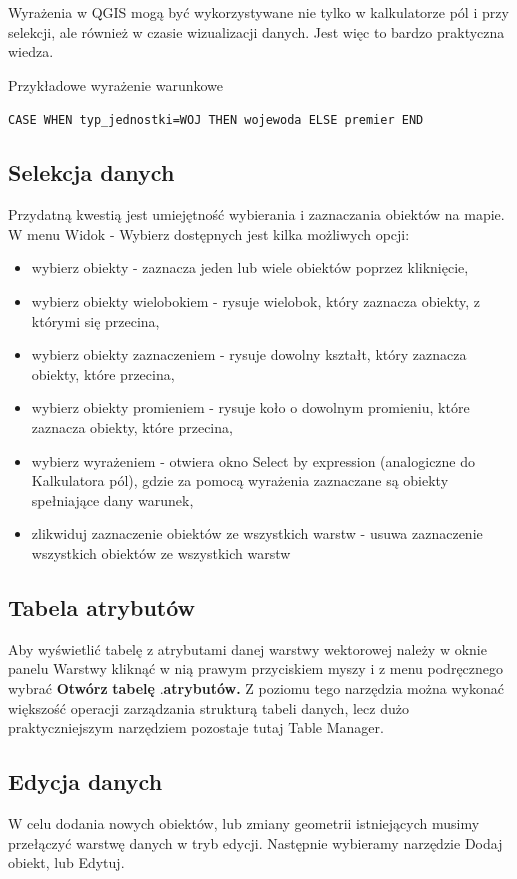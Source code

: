 \documentclass[12pt,a4paper]{book}
\begin{document}
Wyrażenia w QGIS mogą być wykorzystywane nie tylko w kalkulatorze pól i przy selekcji, ale również w czasie wizualizacji danych. Jest więc to bardzo praktyczna wiedza.

Przykładowe wyrażenie warunkowe

\texttt{CASE WHEN typ\_jednostki=WOJ THEN wojewoda ELSE premier END}

\subsection{Selekcja danych}
Przydatną kwestią jest umiejętność wybierania i zaznaczania obiektów na mapie. W menu Widok - Wybierz dostępnych jest kilka możliwych opcji:

\begin{itemize}
\item wybierz obiekty - zaznacza jeden lub wiele obiektów poprzez kliknięcie,
\item  wybierz obiekty wielobokiem - rysuje wielobok, który zaznacza obiekty, z którymi się przecina,
\item  wybierz obiekty zaznaczeniem - rysuje dowolny kształt, który zaznacza obiekty, które przecina,
\item wybierz obiekty promieniem - rysuje koło o dowolnym promieniu, które zaznacza obiekty, które przecina,
\item wybierz wyrażeniem - otwiera okno Select by expression (analogiczne do Kalkulatora pól), gdzie za pomocą wyrażenia zaznaczane są obiekty spełniające dany warunek,
\item zlikwiduj zaznaczenie obiektów ze wszystkich warstw - usuwa zaznaczenie wszystkich obiektów ze wszystkich warstw
\end{itemize}
\subsection{Tabela atrybutów}
Aby wyświetlić tabelę z atrybutami danej warstwy wektorowej należy w oknie panelu Warstwy kliknąć w nią prawym przyciskiem myszy i z menu podręcznego wybrać \textbf{Otwórz} \textbf{tabelę }.\textbf{atrybutów. }Z poziomu tego narzędzia można wykonać większość operacji zarządzania\textbf{ }strukturą tabeli danych, lecz dużo praktyczniejszym narzędziem pozostaje tutaj Table Manager.

\subsection{Edycja danych}
W celu dodania nowych obiektów, lub zmiany geometrii istniejących musimy przełączyć warstwę danych w tryb edycji. Następnie wybieramy narzędzie Dodaj obiekt, lub Edytuj.
\end{document}
